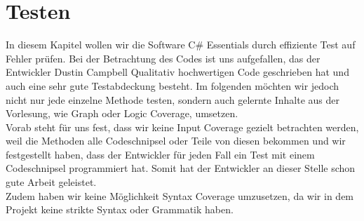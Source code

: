 %
\section{Testen}
In diesem Kapitel wollen wir die Software C\# Essentials durch effiziente Test auf Fehler prüfen. Bei der Betrachtung des Codes ist uns aufgefallen, das der Entwickler Dustin Campbell Qualitativ hochwertigen Code geschrieben hat und auch eine sehr gute Testabdeckung besteht. Im folgenden möchten wir jedoch nicht nur jede einzelne Methode testen, sondern auch gelernte Inhalte aus der Vorlesung, wie Graph oder Logic Coverage, umsetzen.\\
Vorab steht für uns fest, dass wir keine Input Coverage gezielt betrachten werden, weil die Methoden alle Codeschnipsel oder Teile von diesen bekommen und wir festgestellt haben, dass der Entwickler für jeden Fall ein Test mit einem Codeschnipsel programmiert hat. Somit hat der Entwickler an dieser Stelle schon gute Arbeit geleistet.\\
Zudem haben wir keine Möglichkeit Syntax Coverage umzusetzen, da wir in dem Projekt keine strikte Syntax oder Grammatik haben. 

